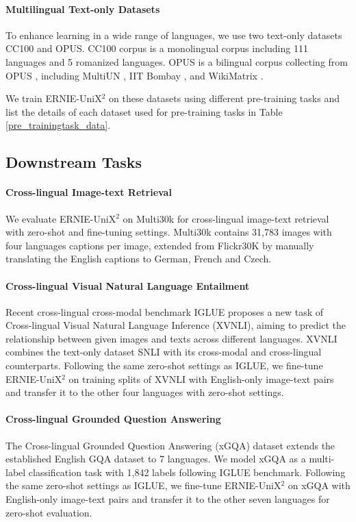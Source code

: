 \documentclass{article}
\begin{document}
\paragraph{Multilingual Text-only Datasets}
To enhance learning in a wide range of languages, we use two text-only datasets CC100 and OPUS. CC100 corpus is a monolingual corpus \cite{wenzek-etal-2020-ccnet} including 111 languages and 5 romanized languages. OPUS is a bilingual corpus collecting from OPUS \cite{opus-2012}, including MultiUN \cite{ziemski-etal-2016-united}, IIT Bombay \cite{kunchukuttan-etal-2018-iit}, and WikiMatrix \cite{wikimatrix}. 

We train ERNIE-UniX$^2$ on these datasets using different pre-training tasks and list the details of each dataset used for pre-training tasks in Table \ref{pre_trainingtask_data}. 

\subsection{Downstream Tasks}
\paragraph{Cross-lingual Image-text Retrieval}
We evaluate ERNIE-UniX$^2$ on Multi30k \cite{elliott-etal-2016-multi30k,elliott-EtAl:2017:WMT,barrault2018findings} for cross-lingual image-text retrieval with zero-shot and fine-tuning settings. Multi30k \cite{elliott-etal-2016-multi30k} contains 31,783 images with four languages captions per image, extended from Flickr30K \cite{flicker30K} by manually translating the English captions to German, French and Czech.
\paragraph{Cross-lingual Visual Natural Language Entailment}
Recent cross-lingual cross-modal benchmark IGLUE \cite{iglue2022} proposes a new task of Cross-lingual Visual Natural Language Inference (XVNLI), aiming to predict the relationship between given images and texts across different languages. XVNLI combines the text-only dataset SNLI \cite{snli2015} with its cross-modal \cite{xvnli-modal} and cross-lingual \cite{xvnli-lingual} counterparts. Following the same zero-shot settings as IGLUE, we fine-tune ERNIE-UniX$^2$ on training splits of XVNLI with English-only image-text pairs and transfer it to the other four languages with zero-shot settings.
\paragraph{Cross-lingual Grounded Question Answering }
The Cross-lingual Grounded Question Answering (xGQA) \cite{xGQA2021} dataset extends the established English GQA \cite{GQA2019} dataset to 7 languages. We model xGQA as a multi-label classification task with 1,842 labels following IGLUE \cite{iglue2022} benchmark. Following the same zero-shot settings as IGLUE, we fine-tune ERNIE-UniX$^2$ on xGQA with English-only image-text pairs and transfer it to the other seven languages for zero-shot evaluation. 
\end{document}
